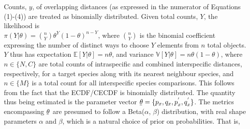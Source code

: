 \documentclass[12pt]{article}
\begin{document}
Counts, $y$, of overlapping distances (as expressed in the numerator of Equations (1)-(4)) are treated as binomially distributed. Given total counts, $Y$, the likelihood is \\ $\pi(Y|\theta) = \binom{n}{Y}\theta^Y(1-\theta)^{n-Y}$, where $\binom{n}{Y}$ is the binomial coefficient expressing the number of distinct ways to choose $Y$ elements from $n$ total objects. $Y$ thus has expectation $\mathbb{E}[Y|\theta] = n\theta$, and variance $\mathbb{V}[Y|\theta] = n\theta(1 - \theta)$, where $n \in \{N, C\}$ are total counts of intraspecific and combined interspecific distances, respectively, for a target species along with its nearest neighbour species, and $n \in \{M\}$ is a total count for all interspecific species comparisons. This follows from the fact that the ECDF/CECDF is binomially distributed. The quantity thus being estimated is the parameter vector $\underaccent{\bar}{\theta} = \{p_x, q_x, p^{'}_x, q^{'}_x\}$. The metrics encompassing $\underaccent{\bar}{\theta} $ are presumed to follow a Beta($\alpha$, $\beta$) distribution, with real shape parameters $\alpha$ and $\beta$, which is a natural choice of prior on probabilities. That is,
\end{document}
